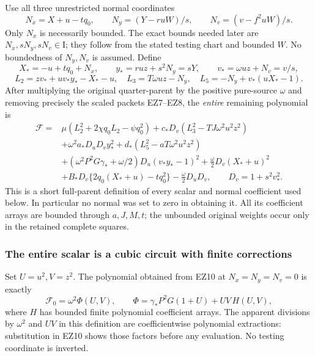 Use all three unrestricted normal coordinates
\[
 N_x=X+u-tq_0,\qquad
 N_y=(Y-ruW)/s,\qquad N_v=(v-f^2uW)/s.
                                                               \tag{EZ9}
\]
Only $N_x$ is necessarily bounded. The exact bounds needed later are
$N_x,sN_y,sN_v\in\mathrm I$; they follow from the stated testing
chart and bounded $W$. No boundedness of $N_y,N_v$ is assumed.
Define
\[
 X_*=-u+tq_0+N_x,\qquad
 y_*=ruz+s^2N_y=sY,\qquad
 v_*=\omega uz+N_v=v/s,
\]
\[
 L_2=zv_*+uv_*y_*-X_*-u,\quad
 L_3=T\omega uz-N_y,\quad
 L_5=-N_y+v_*(uX_*-1).
\]
After multiplying the original quarter-parent by the positive
pure-source $\omega$ and removing precisely the scaled packets
EZ7--EZ8, the \emph{entire} remaining polynomial is
\[
\begin{split}
\mathcal F={}&
 \mu(L_2^2+2\chi q_0L_2-\psi q_0^2)
 +c_*D_v(L_3^2-TJ\omega^2u^2z^2)\\
 &+\omega^2a_*D_uD_vy_*^2
 +d_*(L_5^2-aT\omega^2u^2z^2)\\
 &+(\omega^2P^2G\gamma_*+\omega/2)
                         D_u(v_*y_*-1)^2
 +\frac{\omega}{2}D_v(X_*+u)^2\\
 &+B_*D_v\{2q_0(X_*+u)-tq_0^2\}
                         -\frac{\omega}{2}D_uD_v,
 \qquad D_v=1+s^2v_*^2 .
\end{split}                                                     \tag{EZ10}
\]
This is a short full-parent definition of every scalar and normal
coefficient used below. In particular no normal was set to zero
in obtaining it. All its coefficient arrays are bounded through
$a,J,M,t$; the unbounded original weights occur only in the
retained complete squares.

\subsubsection*{The entire scalar is a cubic circuit with finite corrections}

Set $U=u^2,V=z^2$. The polynomial obtained from EZ10 at
$N_x=N_y=N_v=0$ is exactly
\[
 \mathcal F_0=\omega^2\Phi(U,V),\qquad
 \Phi=\gamma_*P^2G(1+U)+UV\,H(U,V),                            \tag{EZ11}
\]
where $H$ has bounded finite polynomial coefficient arrays.
The apparent divisions by $\omega^2$ and $UV$ in this definition
are coefficientwise polynomial extractions: substitution in EZ10
shows those factors before any evaluation. No testing coordinate
is inverted.

